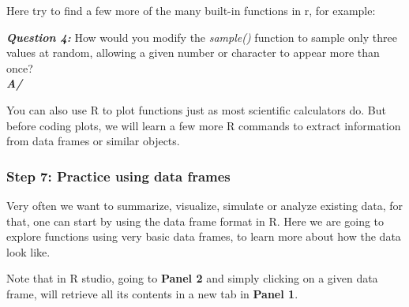 \documentclass[]{article}
\newenvironment{Shaded}{\begin{snugshade}}{\end{snugshade}}
\newcommand{\CommentTok}[1]{\textcolor[rgb]{0.56,0.35,0.01}{\textit{#1}}}
\newcommand{\DataTypeTok}[1]{\textcolor[rgb]{0.13,0.29,0.53}{#1}}
\newcommand{\DecValTok}[1]{\textcolor[rgb]{0.00,0.00,0.81}{#1}}
\newcommand{\KeywordTok}[1]{\textcolor[rgb]{0.13,0.29,0.53}{\textbf{#1}}}
\newcommand{\NormalTok}[1]{#1}
\newcommand{\OperatorTok}[1]{\textcolor[rgb]{0.81,0.36,0.00}{\textbf{#1}}}
\newcommand{\OtherTok}[1]{\textcolor[rgb]{0.56,0.35,0.01}{#1}}
\begin{document}
Here try to find a few more of the many built-in functions in r, for
example:

\begin{Shaded}
\end{Shaded}

\textbf{\emph{Question 4:}} How would you modify the \emph{sample()}
function to sample only three values at random, allowing a given number
or character to appear more than once?\\
\textbf{\emph{A/}}

You can also use R to plot functions just as most scientific calculators
do. But before coding plots, we will learn a few more R commands to
extract information from data frames or similar objects.

\hypertarget{step-7-practice-using-data-frames}{%
\subsubsection{Step 7: Practice using data
frames}\label{step-7-practice-using-data-frames}}

Very often we want to summarize, visualize, simulate or analyze existing
data, for that, one can start by using the data frame format in R. Here
we are going to explore functions using very basic data frames, to learn
more about how the data look like.

Note that in R studio, going to \textbf{Panel 2} and simply clicking on
a given data frame, will retrieve all its contents in a new tab in
\textbf{Panel 1}.
\end{document}
